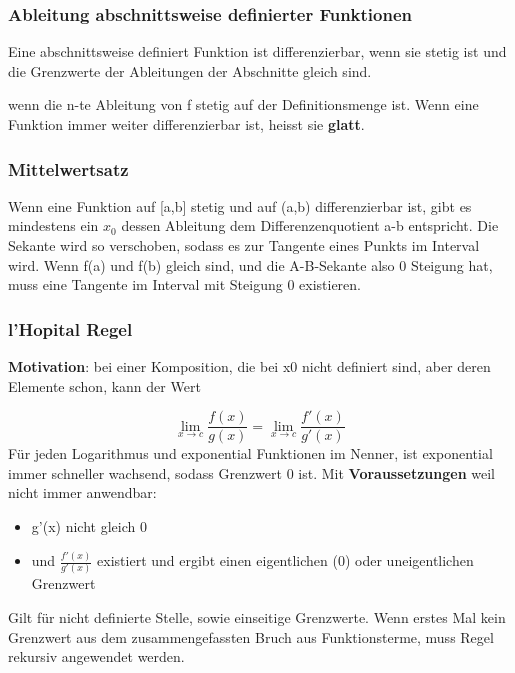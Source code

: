 \subsubsection{Ableitung abschnittsweise definierter Funktionen}
\begin{theorem}
    Eine abschnittsweise definiert Funktion ist differenzierbar, wenn sie stetig ist und die Grenzwerte der Ableitungen der Abschnitte gleich sind.
\end{theorem}

\begin{definition}
     wenn die n-te Ableitung von f stetig auf der Definitionsmenge ist. Wenn eine Funktion immer weiter differenzierbar ist, heisst sie \textbf{glatt}.
\end{definition}


\subsubsection{Mittelwertsatz}

\begin{theorem}
    Wenn eine Funktion auf [a,b] stetig und auf (a,b) differenzierbar ist, gibt es mindestens ein $x_0$ dessen Ableitung dem Differenzenquotient a-b entspricht. Die Sekante wird so verschoben, sodass es zur Tangente eines Punkts im Interval wird.
    Wenn f(a) und f(b) gleich sind, und die A-B-Sekante also 0 Steigung hat, muss eine Tangente im Interval mit Steigung 0 existieren.
\end{theorem}

\subsubsection{l'Hopital Regel}

\textbf{Motivation}: bei einer Komposition, die bei x0 nicht definiert sind, aber deren Elemente schon, kann der Wert 

\begin{definition}
    [l'Hopital]   
    \[
    \lim_{x \rightarrow c} \frac{f(x)}{g(x)} =  \lim_{x \rightarrow c} \frac{f'(x)}{g'(x)}
    \]
    Für jeden Logarithmus  und  exponential Funktionen im Nenner, ist exponential immer schneller wachsend, sodass Grenzwert 0 ist.
    Mit \textbf{Voraussetzungen} weil nicht immer anwendbar:
    \begin{itemize}
        \item g'(x) nicht gleich 0
        \item und $\frac{f'(x)}{g'(x)}$ existiert und ergibt einen eigentlichen (0) oder uneigentlichen Grenzwert
    \end{itemize}
    Gilt für nicht definierte Stelle, sowie einseitige Grenzwerte. Wenn erstes Mal kein Grenzwert aus dem zusammengefassten Bruch aus Funktionsterme, muss Regel rekursiv angewendet werden.
\end{definition}